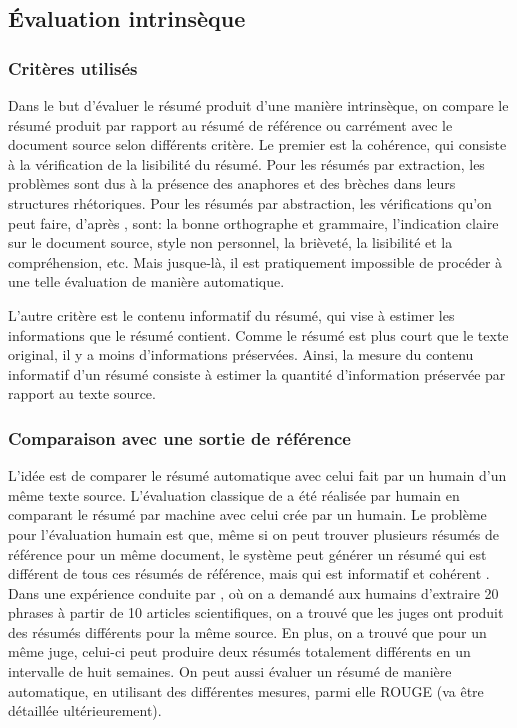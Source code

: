 \documentclass[a4paper,12pt,oneside]{../use/ESIthesis}
\begin{document}
\subsection{Évaluation intrinsèque}

\subsubsection{Critères utilisés}

Dans le but d'évaluer le résumé produit d'une manière intrinsèque, on compare le résumé produit par rapport au résumé de référence ou carrément avec le document source selon différents critère.
Le premier est la cohérence, qui consiste à la vérification de la lisibilité du résumé. 
Pour les résumés par extraction, les problèmes sont dus à la présence des anaphores et des brèches dans leurs structures rhétoriques. 
Pour les résumés par abstraction, les vérifications qu'on peut faire, d'après \cite{00-saggion-lapalme}, sont: la bonne orthographe et grammaire, l'indication claire sur le document source, style non personnel, la brièveté, la lisibilité et la compréhension, etc. 
Mais jusque-là, il est pratiquement impossible de procéder à une telle évaluation de manière automatique. 

L'autre critère est le contenu informatif du résumé, qui vise à estimer les informations que le résumé contient. 
Comme le résumé est plus court que le texte original, il y a moins d'informations préservées. 
Ainsi, la mesure du contenu informatif d'un résumé consiste à estimer la quantité d'information préservée par rapport au texte source. 

\subsubsection{Comparaison avec une sortie de référence}

L'idée est de comparer le résumé automatique avec celui fait par un humain d'un même texte source. 
L'évaluation classique de \cite{69-edmundson} a été réalisée par humain en comparant le résumé par machine avec celui crée par un humain. 
Le problème pour l'évaluation humain est que, même si on peut trouver plusieurs résumés de référence pour un même document, le système peut générer un résumé qui est différent de tous ces résumés de référence, mais qui est informatif et cohérent \cite{01-mani}. 
Dans une expérience conduite par \cite{61-rath-al}, où on a demandé aux humains d'extraire 20 phrases à partir de 10 articles scientifiques, on a trouvé que les juges ont produit des résumés différents pour la même source. 
En plus, on a trouvé que pour un même juge, celui-ci peut produire deux résumés totalement différents en un intervalle de huit semaines.
On peut aussi évaluer un résumé de manière automatique, en utilisant des différentes mesures, parmi elle ROUGE (va être détaillée ultérieurement).
\end{document}
